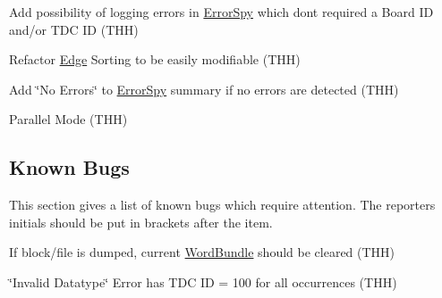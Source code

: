 \begin{DoxyItemize}
\item Add possibility of logging errors in \hyperlink{class_error_spy}{Error\+Spy} which don\textquotesingle{}t required a Board ID and/or T\+DC ID (T\+HH)
\item Refactor \hyperlink{class_edge}{Edge} Sorting to be easily modifiable (T\+HH)
\item Add \char`\"{}\+No Errors\char`\"{} to \hyperlink{class_error_spy}{Error\+Spy} summary if no errors are detected (T\+HH)
\item Parallel Mode (T\+HH)
\end{DoxyItemize}

\subsection*{Known Bugs \label{_KnownBugs}%
}

This section gives a list of known bugs which require attention. The reporter\textquotesingle{}s initials should be put in brackets after the item.


\begin{DoxyItemize}
\item If block/file is dumped, current \hyperlink{class_word_bundle}{Word\+Bundle} should be cleared (T\+HH)
\item \char`\"{}\+Invalid Datatype\char`\"{} Error has T\+DC ID = 100 for all occurrences (T\+HH) 
\end{DoxyItemize}